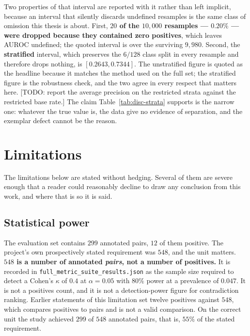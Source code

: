 Two properties of that interval are reported with it rather than left implicit,
because an interval that silently discards undefined resamples is the same class
of omission this thesis is about. First, \textbf{$20$ of the $10{,}000$
resamples --- $0.20\%$ --- were dropped because they contained zero positives},
which leaves AUROC undefined; the quoted interval is over the surviving $9{,}980$.
Second, the \textbf{stratified} interval, which preserves the $6/128$ class split
in every resample and therefore drops nothing, is $[0.2643, 0.7344]$. The
unstratified figure is quoted as the headline because it matches the method used
on the full set; the stratified figure is the robustness check, and the two agree
in every respect that matters here. [TODO: report the average precision on the
restricted strata against the restricted base rate.] The claim
Table~\ref{tab:disc-strata} supports is the narrow one: whatever the true value
is, the data give no evidence of separation, and the exemplar defect cannot be
the reason.

\section{Limitations}
\label{sec:disc-limitations}

The limitations below are stated without hedging. Several of them are severe
enough that a reader could reasonably decline to draw any conclusion from this
work, and where that is so it is said.

\subsection{Statistical power}
\label{sec:disc-power}

The evaluation set contains $299$ annotated pairs, $12$ of them positive. The
project's own prospectively stated requirement was $548$, and the unit matters.
\textbf{$548$ is a number of annotated \emph{pairs}, not a number of positives.}
It is recorded in \texttt{full\_metric\_suite\_results.json} as the sample size
required to detect a Cohen's $\kappa$ of $0.4$ at $\alpha = 0.05$ with $80\%$
power at a prevalence of $0.047$. It is not a positives count, and it is not a
detection-power figure for contradiction ranking. Earlier statements of this
limitation set twelve positives against $548$, which compares positives to pairs
and is not a valid comparison. On the correct unit the study achieved $299$ of
$548$ annotated pairs, that is, $55\%$ of the stated requirement.

